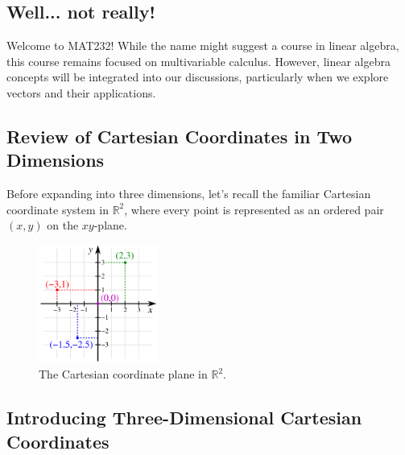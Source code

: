 \documentclass{article}
\begin{document}
\subsection*{Well... not really!}

Welcome to MAT232! While the name might suggest a course in linear algebra, this course remains focused on multivariable calculus. However, linear algebra concepts will be integrated into our discussions, particularly when we explore vectors and their applications.

\subsection*{Review of Cartesian Coordinates in Two Dimensions}

\begin{remarkbox}
Before expanding into three dimensions, let's recall the familiar Cartesian coordinate system in \( \mathbb{R}^2 \), where every point is represented as an ordered pair \( (x, y) \) on the \( xy \)-plane.

\begin{blankbox}
\begin{figure}[H]
    \centering
    \includegraphics[width=0.35\textwidth]{cartesian plane in 2D.png}
    \caption{The Cartesian coordinate plane in \( \mathbb{R}^2 \).}
    \label{fig:2d_cartesian}
\end{figure}
\end{blankbox}
\end{remarkbox}

\subsection*{Introducing Three-Dimensional Cartesian Coordinates}
\end{document}
